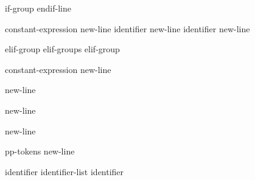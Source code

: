\documentclass{wg21}
\begin{document}
\begin{bnf}
    \br
    if-group   endif-line
\end{bnf}

\begin{bnf}\obeyspaces
    \br
     constant-expression new-line \br
     identifier new-line \br
     identifier new-line 
\end{bnf}

\begin{bnf}
    \br
    elif-group\br
    elif-groups elif-group
\end{bnf}

\begin{bnf}\obeyspaces
    \br
     constant-expression new-line 
\end{bnf}

\begin{bnf}\obeyspaces
    \br
     new-line 
\end{bnf}

\begin{bnf}\obeyspaces
    \br
     new-line
\end{bnf}

\begin{bnf}
    \br
     new-line
\end{bnf}

\begin{bnf}
    \br
    pp-tokens new-line
\end{bnf}

\begin{bnf}
    \br
\end{bnf}

\begin{bnf}
    \br
    identifier\br
    identifier-list \terminal{,} identifier
\end{bnf}

\begin{bnf}
    \br
\end{bnf}
\end{document}
